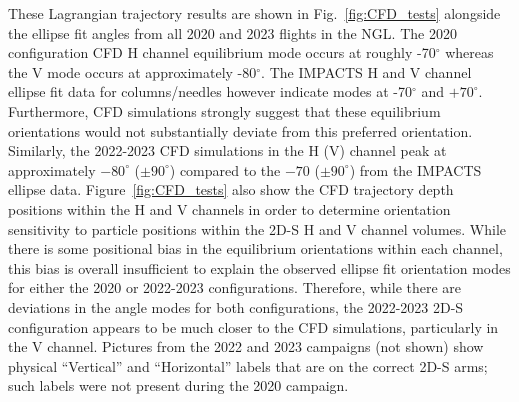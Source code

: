 \documentclass[amt, manuscript]{copernicus}
\begin{document}

These Lagrangian trajectory results are shown in Fig.~\ref{fig:CFD_tests} alongside the ellipse fit angles from all 2020 and 2023 flights in the NGL. The 2020 configuration CFD H channel equilibrium mode occurs at roughly -70$^{\circ}$ whereas the V mode occurs at approximately -80$^{\circ}$. The IMPACTS H and V channel ellipse fit data for columns/needles however indicate modes at -70$^{\circ}$ and $+70^{\circ}$. Furthermore, CFD simulations strongly suggest that these equilibrium orientations would not substantially deviate from this preferred orientation. Similarly, the 2022-2023 CFD simulations in the H (V) channel peak at approximately $-80^{\circ}$ ($\pm 90^{\circ}$) compared to the $-70$ ($\pm 90^{\circ}$) from the IMPACTS ellipse data. Figure~\ref{fig:CFD_tests} also show the CFD trajectory depth positions within the H and V channels in order to determine orientation sensitivity to particle positions within the 2D-S H and V channel volumes. While there is some positional bias in the equilibrium orientations within each channel, this bias is overall insufficient to explain the observed ellipse fit orientation modes for either the 2020 or 2022-2023 configurations. Therefore, while there are deviations in the angle modes for both configurations, the 2022-2023 2D-S configuration appears to be much closer to the CFD simulations, particularly in the V channel. Pictures from the 2022 and 2023 campaigns (not shown) show physical ``Vertical'' and ``Horizontal'' labels that are on the correct 2D-S arms; such labels were not present during the 2020 campaign.  
\end{document}
